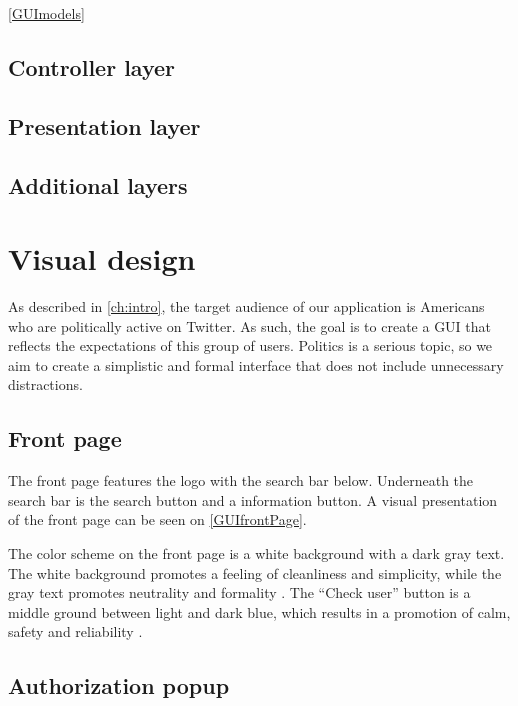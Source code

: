 \autoref{GUImodels}


\subsection{Controller layer}

\subsection{Presentation layer}

\subsection{Additional layers}

\section{Visual design}
As described in \autoref{ch:intro}, the target audience of our application is
Americans who are politically active on Twitter. As such, the goal is to create
a GUI that reflects the expectations of this group of users. Politics is a serious
topic, so we aim to create a simplistic and formal interface that does not
include unnecessary distractions.

\subsection{Front page}
The front page features the logo with the search bar below. Underneath the
search bar is the search button and a information button. A visual presentation
of the front page can be seen on \autoref{GUIfrontPage}.

{}

The color scheme on the front page is a white background with a dark gray text.
The white background promotes a feeling of cleanliness and simplicity, while the
gray text promotes neutrality and formality \citep[p. 63 \& 64]{WebUI}. 
The ``Check user'' button is a middle ground between light and dark blue, which
results in a promotion of calm, safety and reliability \citep[p. 61]{WebUI}.

\subsection{Authorization popup}

